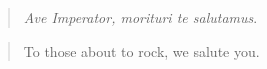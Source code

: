 
\cleardoublepage
\thispagestyle{empty}
\vspace*{0.25\textheight}

\begin{quote}
\Large\emph{Ave Imperator, morituri te salutamus}.
\end{quote}

\begin{quote}
\Large To those about to rock, we salute you.
\end{quote}

\clearpage
